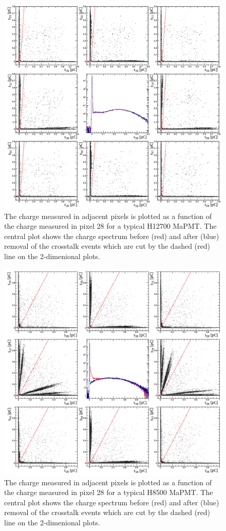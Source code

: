 \begin{figure}
	\centering
	\includegraphics[width=0.95\linewidth]{figures/H12700_ct.png}
	\caption{The charge measured in adjacent pixels is plotted as a function of the charge measured in pixel 28 for a typical H12700 MaPMT. The central plot shows the charge spectrum before (red) and after (blue) removal of the crosstalk events which are cut by the dashed (red) line on the 2-dimenional plots.}
	\label{fig:H12700neighbors}
\end{figure}
\begin{figure}
	\includegraphics[width=0.95\linewidth]{figures/H8500_ct.png}
	\caption{The charge measured in adjacent pixels is plotted as a function of the charge measured in pixel 28 for a typical H8500 MaPMT. The central plot shows the charge spectrum before (red) and after (blue) removal of the crosstalk events which are cut by the dashed (red) line on the 2-dimenional plots.}
	\label{fig:H8500neighbors}
\end{figure}

